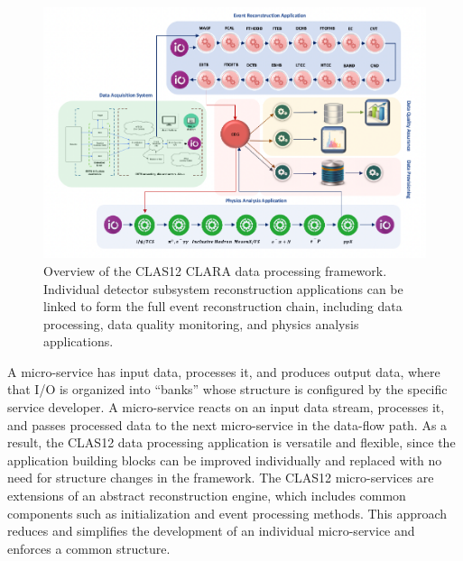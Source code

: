 \begin{figure}[t]
\centering
\includegraphics[width=1.0\textwidth]{pics/clara-overview.pdf}
\caption{Overview of the CLAS12 CLARA data processing framework.  Individual detector subsystem
  reconstruction applications can be linked to form the full event reconstruction chain, including  data processing,
  data quality monitoring, and physics analysis applications.}
\label{fig:clara-overview}
\end{figure}

A micro-service has input data, processes it, and produces output data, where that I/O is organized into ``banks''
whose structure is configured by the specific service developer.  A micro-service reacts on an input data stream,
processes it, and passes processed data to the next micro-service in the data-flow path.  As a result, the CLAS12
data processing application is versatile and flexible, since the application building blocks can be improved individually
and replaced with no need for structure changes in the framework. The CLAS12 micro-services are extensions of an
abstract reconstruction engine, which includes common components such as initialization and event processing
methods. This approach reduces and simplifies the development of an individual micro-service and enforces a common
structure. 


